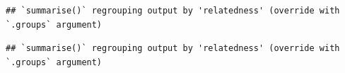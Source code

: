 \documentclass[
]{article}
\newenvironment{Shaded}{\begin{snugshade}}{\end{snugshade}}
\newcommand{\DataTypeTok}[1]{\textcolor[rgb]{0.13,0.29,0.53}{#1}}
\newcommand{\KeywordTok}[1]{\textcolor[rgb]{0.13,0.29,0.53}{\textbf{#1}}}
\newcommand{\NormalTok}[1]{#1}
\newcommand{\OperatorTok}[1]{\textcolor[rgb]{0.81,0.36,0.00}{\textbf{#1}}}
\newcommand{\StringTok}[1]{\textcolor[rgb]{0.31,0.60,0.02}{#1}}
\begin{document}
\begin{verbatim}
## `summarise()` regrouping output by 'relatedness' (override with `.groups` argument)
\end{verbatim}

\begin{Shaded}
\end{Shaded}

\begin{verbatim}
## `summarise()` regrouping output by 'relatedness' (override with `.groups` argument)
\end{verbatim}
\end{document}
